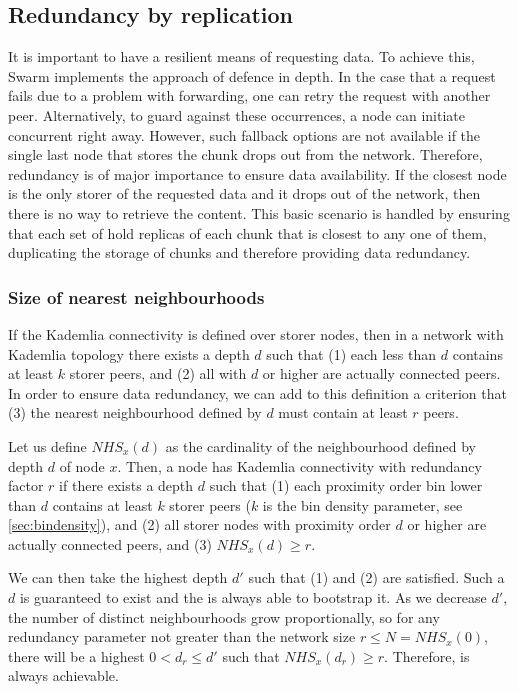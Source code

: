 \subsection{Redundancy by replication\statusgreen}\label{sec:redundancy-by-local-replication}

It is important to have a resilient means of requesting data. To achieve this, Swarm implements the approach of defence in depth. In the case that a request fails due to a problem with forwarding, one can retry the request with another peer. Alternatively, to guard against these occurrences, a node can initiate concurrent  right away. However, such fallback options are not available if the single last node that stores the chunk drops out from the network. Therefore, redundancy is of major importance to ensure data availability. If the closest node is the only storer of the requested data and it drops out of the network, then there is no way to retrieve the content. This basic scenario is handled by ensuring that each set of  hold replicas of each chunk that is closest to any one of them, duplicating the storage of chunks and therefore providing data redundancy. 

\subsubsection{Size of nearest neighbourhoods}

If the Kademlia connectivity is defined over storer nodes, then in a network with Kademlia topology there exists a depth $d$ such that (1) each  less than $d$ contains at least $k$ storer peers, and (2) all  with  $d$ or higher are actually connected peers. In order to ensure data redundancy, we can add to this definition a criterion that (3) the nearest neighbourhood defined by $d$ must contain at least $r$ peers.

Let us define  $\mathit{NHS}_x(d)$  as the cardinality of the neighbourhood defined by depth $d$ of node $x$. 
Then, a node has Kademlia connectivity with redundancy factor $r$ if there exists a depth $d$ such that (1) each proximity order bin lower than $d$ contains at least $k$ storer peers ($k$ is the bin density parameter, see \ref{sec:bindensity}), and (2) all storer nodes with proximity order $d$ or higher are actually connected peers, and (3) $\mathit{NHS}_x(d)\geq r$.

We can then take the highest depth $d'$ such that (1) and (2) are satisfied. Such a $d$ is guaranteed to exist and the  is always able to bootstrap it. As we decrease $d'$, the number of distinct neighbourhoods grow proportionally, so for any redundancy parameter not greater than the network size $r\leq N=\mathit{NHS}_x(0)$, there will be a highest $0<d_r\leq d'$ such that $\mathit{NHS}_x(d_r)\geq r$. Therefore,  is always achievable. 



